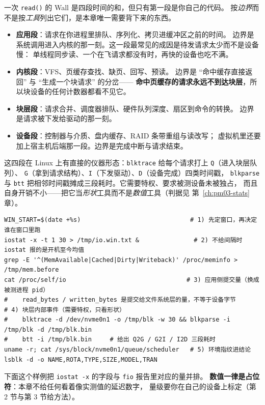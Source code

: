 \documentclass[12pt,a4paper,fontset=fandol]{ctexbook}
\newcommand{\Fn}[1]{\texttt{#1()}}
\newcommand{\Tp}[1]{\texttt{#1}}
\newcommand{\Lang}[1]{\textsf{#1}}
\newcommand{\MWall}{\Lang{Wall}}
\begin{document}
一次 \Fn{read} 的 \MWall{} 是四段时间的和，但只有第一段是你自己的代码。
按\emph{边界}而不是按\emph{工具}列出它们，是本章唯一需要背下来的东西。

\begin{itemize}
\item \textbf{应用段}：请求在你进程里排队、序列化、拷贝进缓冲区之前的时间。
  边界是系统调用进入内核的那一刻。这一段最常见的成因是待发请求太少而不是设备慢：
  单线程同步读、一个在飞请求都没有时，再快的设备也吃不满。
\item \textbf{内核段}：VFS、页缓存查找、缺页、回写、预读。
  边界是 ``命中缓存直接返回'' 与 ``生成一个块请求'' 的分岔——
  \textbf{命中页缓存的请求永远不到达块层}，所以块设备的任何计数器都看不见它。
\item \textbf{块层段}：请求合并、调度器排队、硬件队列深度、扇区到命令的转换。
  边界是请求被下发给驱动的那一刻。
\item \textbf{设备段}：控制器与介质、盘内缓存、RAID 条带重组与读改写；
  虚拟机里还要加上宿主机后端那一段。边界是完成中断与请求结束。
\end{itemize}

这四段在 Linux 上有直接的仪器形态：\Tp{blktrace} 给每个请求打上 \Tp{Q}（进入块层队列）、
\Tp{G}（拿到请求结构）、\Tp{I}（下发驱动）、\Tp{D}（设备完成）四类时间戳，
\Tp{blkparse} 与 \Tp{btt} 把相邻时间戳摊成三段耗时。它需要特权、要求被测设备未被独占，
而且自身开销不小——把它当\emph{形状}工具而不是\emph{数值}工具（判据见 第~\ref{ch:pm03-stats} 章）。

\begin{lstlisting}[style=shellstyle,caption={分账起手式：在同一观测窗内同时取块层与应用侧证据（命令可跑，路径请替换）},label={lst:pm08-ledger}]
WIN_START=$(date +%s)                              # 1) 先定窗口，再决定谁在窗口里跑
iostat -x -t 1 30 > /tmp/io.win.txt &               # 2) 不给间隔时 iostat 报的是开机至今均值
grep -E '^(MemAvailable|Cached|Dirty|Writeback)' /proc/meminfo > /tmp/mem.before
cat /proc/self/io                                 # 3) 应用侧提交量（换成被测进程 pid）
#    read_bytes / written_bytes 是提交给文件系统层的量，不等于设备字节
# 4) 块层内部事件（需要特权，只看形状）
#    blktrace -d /dev/nvme0n1 -o /tmp/blk -w 30 && blkparse -i /tmp/blk -d /tmp/blk.bin
#    btt -i /tmp/blk.bin     # 给出 Q2G / G2I / I2D 三段耗时
uname -r; cat /sys/block/nvme0n1/queue/scheduler   # 5) 环境指纹进结论
lsblk -d -o NAME,ROTA,TYPE,SIZE,MODEL,TRAN
\end{lstlisting}

下面这个样例把 \Tp{iostat -x} 的字段与 \Tp{fio} 报告里对应的量并排。
\textbf{数值一律是占位符}：本章不给任何看着像实测值的延迟数字，
量级要你在自己的设备上标定（第 2 节与第 3 节给方法）。
\end{document}
